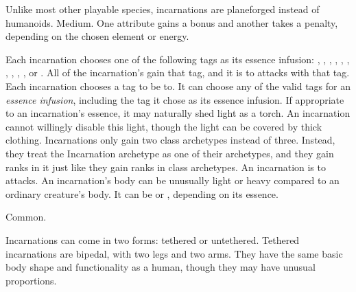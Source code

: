    Unlike most other playable species, incarnations are planeforged instead of humanoids.
   Medium.
   One attribute gains a  bonus and another takes a  penalty, depending on the chosen element or energy.
  \begin{itemize}
     Each incarnation chooses one of the following tags as its essence infusion: \atAcid, \atAir, \atAuditory, \atCold, \atCompulsion, \atEarth, \atEmotion, \atElectricity, \atFire, \atVisual, or \atWater.
      All of the incarnation's  gain that tag, and it is \impervious to attacks with that tag.
     Each incarnation chooses a tag to be \vulnerable to.
      It can choose any of the valid tags for an \textit{essence infusion}, including the tag it chose as its essence infusion.
     If appropriate to an incarnation's essence, it may naturally shed light as a torch.
      An incarnation cannot willingly disable this light, though the light can be covered by thick clothing.
     Incarnations only gain two class archetypes instead of three.
      Instead, they treat the Incarnation archetype as one of their archetypes, and they gain ranks in it just like they gain ranks in class archetypes.
     An incarnation is \impervious to \atPoison attacks.
     An incarnation's body can be unusually light or heavy compared to an ordinary creature's body.
      It can be  or , depending on its essence.
  \end{itemize}
   Common.

  Incarnations can come in two forms: tethered or untethered.
  Tethered incarnations are bipedal, with two legs and two arms.
  They have the same basic body shape and functionality as a human, though they may have unusual proportions.

